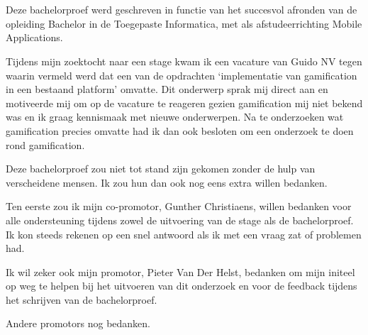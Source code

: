 
\chapter*{}
\label{ch:voorwoord}


Deze bachelorproef werd geschreven in functie van het succesvol afronden van de opleiding Bachelor in de Toegepaste Informatica, met als afstudeerrichting Mobile Applications.

Tijdens mijn zoektocht naar een stage kwam ik een vacature van Guido NV tegen waarin vermeld werd dat een van de opdrachten ‘implementatie van gamification in een bestaand platform’ omvatte. Dit onderwerp sprak mij direct aan en motiveerde mij om op de vacature te reageren gezien gamification mij niet bekend was en ik graag kennismaak met nieuwe onderwerpen. Na te onderzoeken wat gamification precies omvatte had ik dan ook besloten om een onderzoek te doen rond gamification.

Deze bachelorproef zou niet tot stand zijn gekomen zonder de hulp van verscheidene mensen. Ik zou hun dan ook nog eens extra willen bedanken.

Ten eerste zou ik mijn co-promotor, Gunther Christiaens, willen bedanken voor alle ondersteuning tijdens zowel de uitvoering van de stage als de bachelorproef. Ik kon steeds rekenen op een snel antwoord als ik met een vraag zat of problemen had.

Ik wil zeker ook mijn promotor, Pieter Van Der Helst, bedanken om mijn initeel op weg te helpen bij het uitvoeren van dit onderzoek en voor de feedback tijdens het schrijven van de bachelorproef.

Andere promotors nog bedanken.


